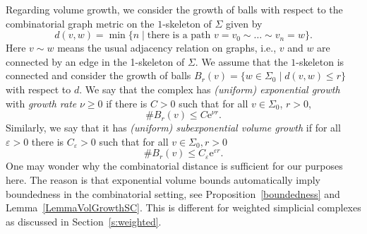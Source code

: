 \documentclass[10pt]{amsart}
\theoremstyle{definition}
\newcommand{\Hmm}[1]{\leavevmode{\marginpar{\tiny%
			$\hbox to 0mm{\hspace*{-0.5mm}$\leftarrow$\hss}%
			\vcenter{\vrule depth 0.1mm height 0.1mm width \the\marginparwidth}%
			\hbox to 0mm{\hss$\rightarrow$\hspace*{-0.5mm}}$\\\relax\raggedright #1}}}
\begin{document}
Regarding volume growth, we consider the growth of balls with respect to %
the combinatorial graph metric on the $1$-skeleton of $\Sigma$ given by 
\begin{equation*}	d(v,w)=\min\{ n\mid \mbox{there is a path } {v=v_{0}\sim\ldots\sim v_{n}=w}\}.\end{equation*}
Here $v\sim w$ means the usual adjacency relation on graphs, i.e., $v$ and $w$ are connected by an edge in the 1-skeleton of $  \Sigma.$ 
We assume that the $1$-skeleton is connected and consider the growth of balls $B_r(v) = \{w\in  \Sigma_0\mid d(v,w)\leq r\}$ with respect to $d$. We say that the complex has \emph{(uniform) exponential growth} with  \textit{growth rate} $\nu\ge 0$ if there is $C>0$ such that for all $v\in  \Sigma_0$, $r>0$,  
\[\#B_r(v)\leq C\mathrm{e}^{\nu r}.\]
Similarly, we say that it has \textit{(uniform) subexponential volume growth} if for all $\varepsilon>0$ there is $C_\varepsilon>0$ such that for all $v\in  \Sigma_0,r>0$
\[\#B_r(v) \leq C_\varepsilon\mathrm{e}^{\varepsilon r} .\]
One may  wonder why the combinatorial distance is sufficient for our purposes here. The reason is that  exponential volume bounds automatically imply boundedness in the combinatorial setting, see Proposition~\ref{boundedness} and Lemma~\ref{LemmaVolGrowthSC}. This is different for weighted simplicial complexes as discussed in Section~\ref{s:weighted}.
\end{document}
